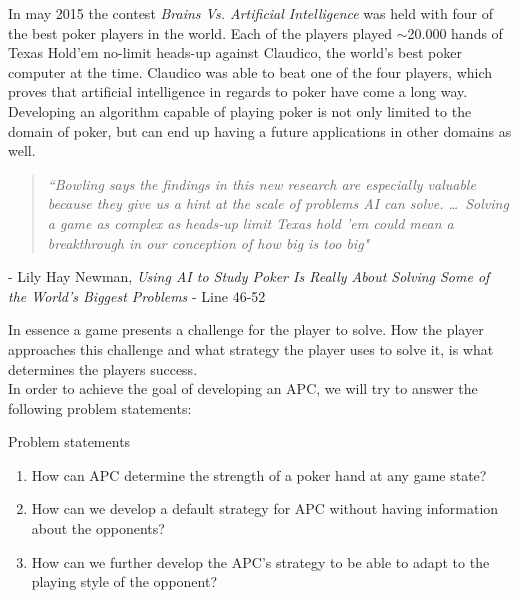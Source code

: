In may 2015 the contest \textit{Brains Vs. Artificial Intelligence} \cite{brain-vs-ai} was held with four of the best poker players in the world. Each of the players played $\sim$20.000 hands of Texas Hold'em no-limit heads-up against Claudico, the world's best poker computer at the time. Claudico was able to beat one of the four players, which proves that artificial intelligence in regards to poker have come a long way.\\

Developing an algorithm capable of playing poker is not only limited to the domain of poker, but can end up having a future applications in other domains as well.

\newcommand{\chapquote}[4]{\begin{quotation} \textit{#1} \end{quotation} \begin{flushright} - #2, \textit{#3} -  #4\end{flushright} }

\chapquote{``Bowling says the findings in this new research are especially valuable because they give us a hint at the scale of problems AI can solve. \ldots ~Solving a game as complex as heads-up limit Texas hold ’em could mean a breakthrough in our conception of how big is too big"}{Lily Hay Newman}{Using AI to Study Poker Is Really About Solving Some of the World’s Biggest Problems}{Line 46-52}

In essence a game presents a challenge for the player to solve. How the player approaches this challenge and what strategy the player uses to solve it, is what determines the players success.\\

In order to achieve the goal of developing an APC, we will try to answer the following problem statements:

\vspace{4mm}
\begin{statementBox2}{Problem statements}
\begin{enumerate}
    \item \label{itm:q1} How can APC determine the strength of a poker hand at any game state? \label{itm:ps1}
    \item \label{itm:q2} How can we develop a default strategy for APC without having information about the opponents? \label{itm:ps2}
    \item \label{itm:q3} How can we further develop the APC's strategy to be able to adapt to the playing style of the opponent? \label{itm:ps3}
  \end{enumerate}
\end{statementBox2}
\vspace{4mm}

